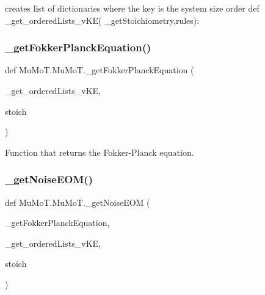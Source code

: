 creates list of dictionaries where the key is the system size order def \+\_\+get\+\_\+ordered\+Lists\+\_\+v\+K\+E( \+\_\+get\+Stoichiometry,rules)\+: 

\mbox{\label{namespace_mu_mo_t_1_1_mu_mo_t_af4a11defe964c17a082b91a97f7f8034}} 
\subsubsection{\texorpdfstring{\+\_\+get\+Fokker\+Planck\+Equation()}{\_getFokkerPlanckEquation()}}
{\footnotesize\ttfamily def Mu\+Mo\+T.\+Mu\+Mo\+T.\+\_\+get\+Fokker\+Planck\+Equation (\begin{DoxyParamCaption}\item[{}]{\+\_\+get\+\_\+ordered\+Lists\+\_\+v\+KE,  }\item[{}]{stoich }\end{DoxyParamCaption})\hspace{0.3cm}{\ttfamily [private]}}



Function that returns the Fokker-\/\+Planck equation. 

\mbox{\label{namespace_mu_mo_t_1_1_mu_mo_t_af8a8a57c2a7c5fc2a4b0a97a8db1fb8d}} 
\subsubsection{\texorpdfstring{\+\_\+get\+Noise\+E\+O\+M()}{\_getNoiseEOM()}}
{\footnotesize\ttfamily def Mu\+Mo\+T.\+Mu\+Mo\+T.\+\_\+get\+Noise\+E\+OM (\begin{DoxyParamCaption}\item[{}]{\+\_\+get\+Fokker\+Planck\+Equation,  }\item[{}]{\+\_\+get\+\_\+ordered\+Lists\+\_\+v\+KE,  }\item[{}]{stoich }\end{DoxyParamCaption})\hspace{0.3cm}{\ttfamily [private]}}



